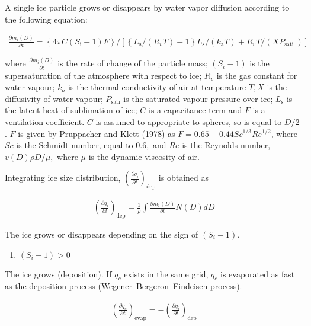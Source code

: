 A single ice particle grows or disappears by water vapor diffusion
according to the following equation:

\begin{eqnarray}
\frac{\partial m_i(D)}{\partial t}=\left\{4 \pi C\left(S_{\mathrm{i}}-1\right) F\right\} /\left[\left\{L_{\mathrm{s}} /(R_{v} T)-1\right\} L_{\mathrm{s}} /\left(k_{\mathrm{a}} T\right)+R_v T /\left(X P_{\text {sati }}\right)\right]
\end{eqnarray}

where \(\frac{\partial m_i(D)}{\partial t}\) is the rate of change of
the particle mass; \((S_i - 1)\) is the supersaturation of the
atmosphere with respect to ice; \(R_v\) is the gas constant for water
vapour; \(k_a\) is the thermal conductivity of air at temperature
\(T, X\) is the diffusivity of water vapour; \(P_{\text {sati}}\) is the
saturated vapour pressure over ice; \(L_{\mathrm{s}}\) is the latent
heat of sublimation of ice; \(C\) is a capacitance term and \(F\) is a
ventilation coefficient. \(C\) is assumed to appropriate to spheres, so
is equal to \(D/2\) . \(F\) is given by Pruppacher and Klett (1978) as
\(F=0.65+0.44 S c^{1 / 3} R e^{1 / 2}\), where \(S c\) is the Schmidt
number, equal to \(0.6,\) and \(R e\) is the Reynolds number,
\(v(D) \rho D / \mu,\) where \(\mu\) is the dynamic viscosity of air.

Integrating ice size distribution,
\(\left(\frac{\partial q_i}{\partial t}\right)_{\text {dep}}\) is
obtained as

\begin{eqnarray}
\left(\frac{\partial q_i}{\partial t}\right)_{\text {dep}}
= \frac{1}{\rho}\int \frac{\partial m_i(D)}{\partial t}N(D)dD
\end{eqnarray}

The ice grows or disappears depending on the sign of \((S_i - 1)\).

\begin{enumerate}
\def\labelenumi{\arabic{enumi}.}
\tightlist
\item
  \((S_i - 1)>0\)
\end{enumerate}

The ice grows (deposition). If \(q_c\) exists in the same grid, \(q_c\)
is evaporated as fast as the deposition process
(Wegener--Bergeron--Findeisen process).

\begin{eqnarray}
\left(\frac{\partial q_c}{\partial t}\right)_{\text {evap}}
=-\left(\frac{\partial q_i}{\partial t}\right)_{\text {dep}}
\end{eqnarray}

